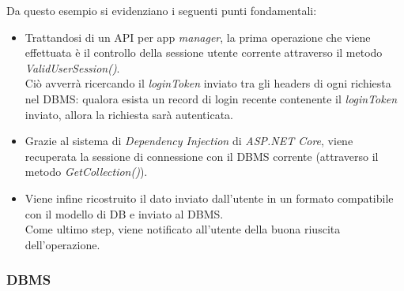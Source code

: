 \documentclass[12pt]{article}
\begin{document}
Da questo esempio si evidenziano i seguenti punti fondamentali:
\begin{itemize}
	\item Trattandosi di un API per app \textit{manager}, la prima operazione che viene effettuata è il controllo della sessione utente corrente attraverso il metodo \textit{ValidUserSession()}.\\
	Ciò avverrà ricercando il \textit{loginToken} inviato tra gli headers di ogni richiesta nel DBMS: qualora esista un record di login recente contenente il \textit{loginToken} inviato, allora la richiesta sarà autenticata.
	\item Grazie al sistema di \textit{Dependency Injection} di \textit{ASP.NET Core}, viene recuperata la sessione di connessione con il DBMS corrente (attraverso il metodo \textit{GetCollection()}).
	\item Viene infine ricostruito il dato inviato dall'utente in un formato compatibile con il modello di DB e inviato al DBMS.\\ Come ultimo step, viene notificato all'utente della buona riuscita dell'operazione.
\end{itemize}
\subsubsection{DBMS}
\end{document}

